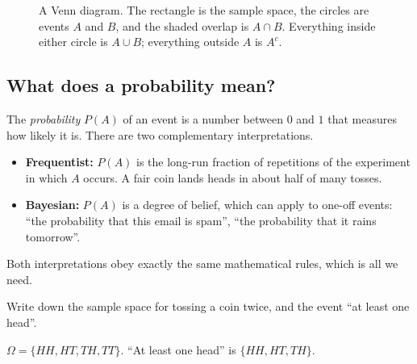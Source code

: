 \begin{figure}[htbp]
\centering
{}
\caption{A Venn diagram. The rectangle is the sample space, the circles are
  events $A$ and $B$, and the shaded overlap is $A \cap B$. Everything inside
  either circle is $A \cup B$; everything outside $A$ is $A^c$.}
\label{fig:venn}
\end{figure}

\subsection{What does a probability mean?}

The \emph{probability} $P(A)$ of an event is a number between $0$ and $1$ that
measures how likely it is. There are two complementary interpretations.
\begin{itemize}
  \item \textbf{Frequentist:} $P(A)$ is the long-run fraction of repetitions of
    the experiment in which $A$ occurs. A fair coin lands heads in about half of
    many tosses.
  \item \textbf{Bayesian:} $P(A)$ is a degree of belief, which can apply to
    one-off events: ``the probability that this email is spam'', ``the
    probability that it rains tomorrow''.
\end{itemize}
Both interpretations obey exactly the same mathematical rules, which is all we
need.

\sectionexercises

\begin{exercise}
Write down the sample space for tossing a coin twice, and the event ``at least
one head''.
\end{exercise}
\begin{solution}
$\Omega = \{HH, HT, TH, TT\}$. ``At least one head'' is $\{HH, HT, TH\}$.
\end{solution}

